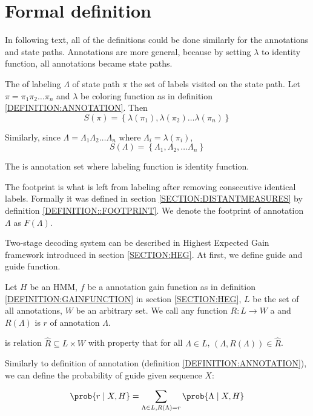 \section{Formal definition}

\begin{note}
In following text, all of the definitions could be done similarly for the
annotations and state paths. Annotations are more general, because by setting
$\lambda$ to identity function, all annotations became state paths.
\end{note}

\begin{definition}
The  of labeling
$\Lambda$ of state path $\pi$ the set of labels visited on the state path.
Let $\pi = \pi_1\pi_2\dots \pi_n$ and $\lambda$ be coloring function as in definition
\ref{DEFINITION:ANNOTATION}. Then 
\[S(\pi) = \left\{\lambda(\pi_1), \lambda(\pi_2)\dots\lambda(\pi_n)\right\}\]

Similarly, since $\Lambda = \Lambda_1\Lambda_2\dots \Lambda_n$ where $\Lambda_i
= \lambda(\pi_i)$, 
\[S(\Lambda) =
\left\{\Lambda_1,\Lambda_2,\dots\Lambda_n\right\}\]

The  is annotation set where labeling function is identity
function.\label{DEFINITION:ANNOTATION_SET}
\end{definition}

The footprint is what is left from labeling after removing consecutive identical
labels. Formally it was defined in section \ref{SECTION:DISTANTMEASURES} by
definition \ref{DEFINITION::FOOTPRINT}.  We denote the footprint of annotation
$\Lambda$ as $F(\Lambda)$.

Two-stage decoding system can be described in Highest Expected Gain framework
introduced in section \ref{SECTION:HEG}. At first, we define guide and guide
function.

\begin{definition}
Let $H$ be an HMM, $f$ be a annotation gain function as in definition
\ref{DEFINITION:GAINFUNCTION} in section \ref{SECTION:HEG}, $L$ be the set of
all annotations, $W$ be an arbitrary set. We call any function
$R:L\to W$ a  and $R(\Lambda)$ is
 $r$ of annotation $\Lambda$.

 is relation $\hat{R}\subseteq L\times W$
with property that for all $\Lambda\in L$, $(\Lambda, R(\Lambda))\in \hat{R}$.

Similarly to definition of annotation (definition \ref{DEFINITION:ANNOTATION}),
we can define the probability of guide given sequence $X$:

\begin{equation}
\prob{r\mid X, H} = \sum_{\Lambda \in L, R(\Lambda)=r} \prob{\Lambda\mid X, H}
\end{equation}

\end{definition}

